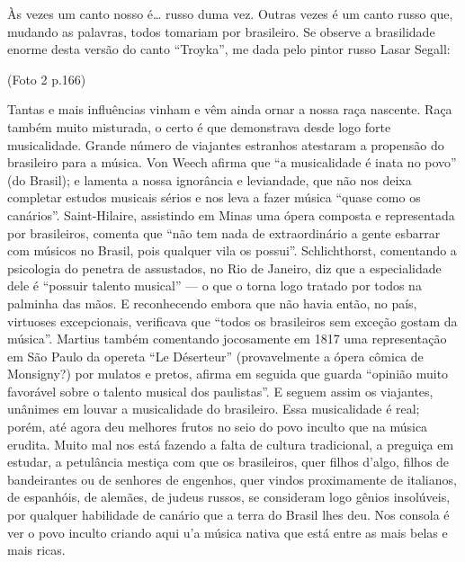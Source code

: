 Às vezes um canto nosso é\ldots{} russo duma vez. Outras vezes é um canto
russo que, mudando as palavras, todos tomariam por brasileiro. Se
observe a brasilidade enorme desta versão do canto ``Troyka'', me dada
pelo pintor russo Lasar Segall:

(Foto 2 p.166)

Tantas e mais influências vinham e vêm ainda ornar a nossa raça
nascente. Raça também muito misturada, o certo é que demonstrava desde
logo forte musicalidade. Grande número de viajantes estranhos atestaram
a propensão do brasileiro para a música. Von Weech afirma que ``a
musicalidade é inata no povo'' (do Brasil); e lamenta a nossa ignorância
e leviandade, que não nos deixa completar estudos musicais sérios e nos
leva a fazer música ``quase como os canários''. Saint-Hilaire,
assistindo em Minas uma ópera composta e representada por brasileiros,
comenta que ``não tem nada de extraordinário a gente esbarrar com
músicos no Brasil, pois qualquer vila os possui''. Schlichthorst,
comentando a psicologia do penetra de assustados, no Rio de Janeiro, diz
que a especialidade dele é ``possuir talento musical'' --- o que o torna
logo tratado por todos na palminha das mãos. E reconhecendo embora que
não havia então, no país, virtuoses excepcionais, verificava que ``todos
os brasileiros sem exceção gostam da música''. Martius também comentando
jocosamente em 1817 uma representação em São Paulo da opereta ``Le
Déserteur'' (provavelmente a ópera cômica de Monsigny?) por mulatos e
pretos, afirma em seguida que guarda ``opinião muito favorável sobre o
talento musical dos paulistas''. E seguem assim os viajantes, unânimes
em louvar a musicalidade do brasileiro. Essa musicalidade é real; porém,
até agora deu melhores frutos no seio do povo inculto que na música
erudita. Muito mal nos está fazendo a falta de cultura tradicional, a
preguiça em estudar, a petulância mestiça com que os brasileiros, quer
filhos d'algo, filhos de bandeirantes ou de senhores de engenhos, quer
vindos proximamente de italianos, de espanhóis, de alemães, de judeus
russos, se consideram logo gênios insolúveis, por qualquer habilidade de
canário que a terra do Brasil lhes deu. Nos consola é ver o povo inculto
criando aqui u'a música nativa que está entre as mais belas e mais
ricas.

